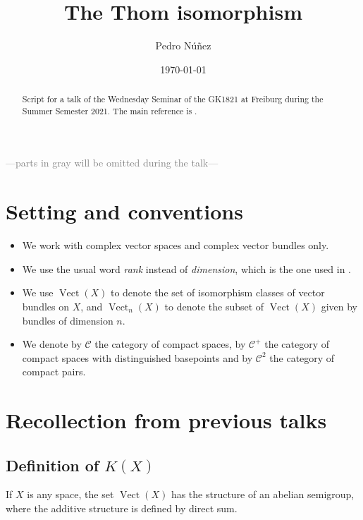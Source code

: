 \documentclass[12pt,a4paper]{amsart}
\title[The Thom isomorphism]{The Thom isomorphism}
\author[Pedro N\'{u}\~{n}ez]{Pedro N\'{u}\~{n}ez}
\date{\today}
\theoremstyle{plain}
\theoremstyle{definition}
\theoremstyle{remark}
\begin{document}
\maketitle

\begin{abstract}
  Script for a talk of the Wednesday Seminar of the GK1821 at Freiburg during the Summer Semester 2021.
  The main reference is \cite[\S 2]{ati67}.
\end{abstract}

\tableofcontents

\begin{center}
  \textcolor{gray}{---parts in gray will be omitted during the talk---}
\end{center}

\section{Setting and conventions}

\begin{itemize}
  \item We work with complex vector spaces and complex vector bundles only.
  \item We use the usual word \textit{rank} instead of \textit{dimension}, which is the one used in \cite{ati67}.
  \item We use $\operatorname{Vect}(X)$ to denote the set of isomorphism classes of vector bundles on $X$, and $\operatorname{Vect}_{n}(X)$ to denote the subset of $\operatorname{Vect}(X)$ given by bundles of dimension $n$.
  \item We denote by $\mathcal{C}$ the category of compact spaces, by $\mathcal{C}^{+}$ the category of compact spaces with distinguished basepoints and by $\mathcal{C}^{2}$ the category of compact pairs.
\end{itemize}

\section{Recollection from previous talks}

\subsection{Definition of $K(X)$}

If $X$ is any space, the set $\operatorname{Vect}(X)$ has the structure of an abelian semigroup, where the additive structure is defined by direct sum.
\end{document}
